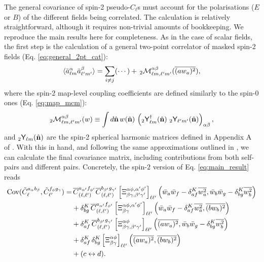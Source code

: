 \documentclass[aps,twocolumn, superscriptaddress, english, nofootinbib, 10pt]{revtex4-2}
\newcommand{\nv}{\hat{\bf n}}
\begin{document}
  The general covariance of spin-2 pseudo-$C_\ell$s must account for the polarisations ($E$ or $B$) of the different fields being correlated. The calculation is relatively straightforward, although it requires non-trivial amounts of bookkeeping. We reproduce the main results here for completeness.  As in the case of scalar fields, the first step is the calculation of a general two-point correlator of masked spin-2 fields (Eq. \ref{eq:general_2pt_cat}):
  \begin{equation}
    \langle\tilde{a}^\alpha_{\ell m}\tilde{a}^\beta_{\ell'm'}\rangle=\sum_{i\neq j}(\cdots)+\,_2{\cal M}^{\alpha\beta}_{\ell m,\ell'm'}(\overline{(aw_a)^2}),
  \end{equation}
  where the spin-2 map-level coupling coefficients are defined similarly to the spin-0 ones (Eq. \ref{eq:map_mcm}):
  \begin{equation}
    _2{\cal M}^{\alpha\beta}_{\ell m,\ell'm'}(w)\equiv\int d\nv\,w(\nv)\,\left(_2{\sf Y}^\dagger_{\ell m}(\nv)\,\,_2{\sf Y}_{\ell'm'}(\nv)\right)_{\alpha\beta},
  \end{equation}
  and $_2{\sf Y}_{\ell m}(\nv)$ are the spin-2 spherical harmonic matrices defined in Appendix A of \cite{1809.09603}. With this in hand, and following the same approximations outlined in \cite{1906.11765}, we can calculate the final covariance matrix, including contributions from both self-pairs and different pairs. Concretely, the spin-$2$ version of Eq. \ref{eq:main_result} reads
  \begin{align}
    {\rm Cov}(\tilde{C}^{a_\alpha b_\beta}_\ell,\tilde{C}^{f_\phi g_\gamma}_{\ell'})=&\,\overline{C}^{a_{\alpha'}f_{\phi'}}_{(\ell,\ell')}\overline{C}^{b_{\beta'}g_{\gamma'}}_{(\ell,\ell')}\left[\Xi^{\alpha\phi,\alpha'\phi'}_{\beta\gamma,\beta'\gamma'}\right]_{\ell\ell'}\left(\bar{w}_a\bar{w}_f-\delta^K_{af}\overline{w_a^2},\bar{w}_b\bar{w}_g-\delta^K_{bg}\overline{w_b^2}\right)\\
    &+\delta^K_{bg}\,\overline{C}^{a_{\alpha'}f_{\phi'}}_{(\ell,\ell')}\left[\Xi^{\alpha\phi,\alpha'\phi'}_{\beta\gamma}\right]_{\ell\ell'}\left(\bar{w}_a\bar{w}_f-\delta^K_{af}\overline{w_a^2},\overline{(bw_b)^2}\right)\\
    &+\delta^K_{af}\,\overline{C}^{b_{\beta'}g_{\gamma'}}_{(\ell,\ell')}\left[\Xi^{\alpha\phi}_{\beta\gamma,\beta'\gamma'}\right]_{\ell\ell'}\left(\overline{(aw_a)^2},\bar{w}_b\bar{w}_g-\delta^K_{bg}\overline{w_b^2}\right)\\
    &+\delta^K_{af}\,\delta^K_{bg}\left[\Xi^{\alpha\phi}_{\beta\gamma}\right]_{\ell\ell'}\left(\overline{(aw_a)^2},\overline{(bw_b)^2}\right)\\\nonumber
      &+(c\leftrightarrow d).
  \end{align}
\end{document}
